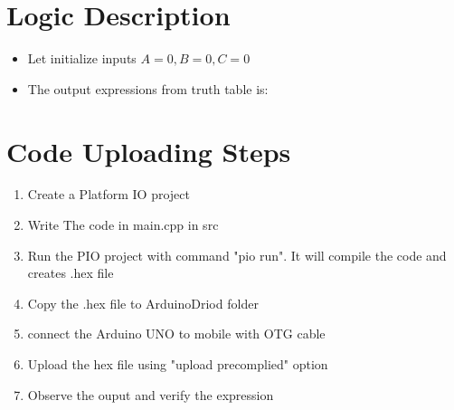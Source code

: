 \documentclass[a4paper,12pt]{article}
\begin{document}
\section*{Logic Description}
\begin{itemize}
	\item Let initialize inputs $A=0,B=0,C=0$
	\item The output expressions from truth table is:
\end{itemize}
\section*{Code Uploading Steps}
\begin{enumerate}
	\item Create a Platform IO project
	\item Write The code in main.cpp in src
	\item Run the PIO project with command "pio run". It will compile the code and creates .hex file
	\item Copy the .hex file to ArduinoDriod folder
	\item connect the Arduino UNO to mobile with OTG cable
	\item Upload the hex file using "upload precomplied" option
	\item Observe the ouput and verify the expression
\end{enumerate}
\end{document}
